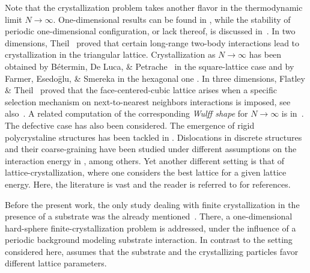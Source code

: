 \documentclass[reqno]{amsart}
\theoremstyle{plain}
\theoremstyle{definition}
\numberwithin{equation}{section}
\begin{document}
Note that the crystallization problem takes another flavor in the thermodynamic
limit $N \to \infty$. One-dimensional results can be found in
\cite{Gardner,Radi,Ventevogel}, while the stability of periodic one-dimensional configuration, or
lack thereof, is
discussed in~\cite{Hamrick}.
In two dimensions, {\sc Theil}~\cite{Theil} proved that
certain long-range two-body interactions lead to crystallization in the triangular
lattice.  Crystallization as $N \to \infty$ has been obtained by {\sc B\'etermin, De Luca,
  \& Petrache}~\cite{Betermin0} in the square-lattice case and by {\sc
  Farmer, Esedo\=glu, \& Smereka} in the hexagonal one
\cite{Smereka15}.  In three dimensions, {\sc Flatley \& Theil}~\cite{Flateley2}
proved that the face-centered-cubic lattice arises when a specific
selection mechanism on next-to-nearest neighbors interactions is imposed, see also~\cite{Flateley1}. A related computation of the
corresponding {\it Wulff shape} for $N\to \infty$ is
in~\cite{cicalese2}. The defective case has also been
considered. The emergence of rigid polycrystaline structures has been
tackled in \cite{FriedrichKreutzSchmidt}. Dislocations in discrete
structures and their coarse-graining have been studied under different
assumptions on the interaction energy in \cite{Ariza,Alicandro1,Alicandro2,Giuliani},
among others.
Yet another different setting is that of lattice-crystallization,
where one considers  the best lattice for a given lattice
energy. Here, the literature is vast and the reader is referred to
\cite{Betermin2,Betermin3,Cohn, Coulangeon} for references.  


Before the present work, the only study dealing with finite
crystallization in the presence of a substrate was the already mentioned~\cite{FriedrichStefanelli}. There, a one-dimensional
hard-sphere finite-crystallization problem is addressed, under the
influence of a periodic background modeling substrate
interaction. In contrast to the setting considered here,
\cite{FriedrichStefanelli} assumes that the substrate and the
crystallizing particles favor different lattice parameters. 
\end{document}
